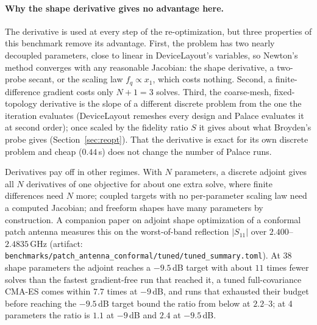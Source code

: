 \documentclass{anvil-paper}
\begin{document}
\paragraph{Why the shape derivative gives no advantage here.}
The derivative is used at every step of the re-optimization, but three
properties of this benchmark remove its advantage. First, the problem has
two nearly decoupled parameters, close to linear in DeviceLayout's
variables, so Newton's method converges with any reasonable Jacobian: the
shape derivative, a two-probe secant, or the scaling law $f_q \propto x_1$,
which costs nothing. Second, a finite-difference gradient costs only $N+1 =
3$ solves. Third, the coarse-mesh, fixed-topology derivative is the slope
of a different discrete problem from the one the iteration evaluates
(DeviceLayout remeshes every design and Palace evaluates it at second
order); once scaled by the fidelity ratio $S$ it gives about what
Broyden's probe gives (Section~\ref{sec:reopt}). That the derivative is exact for its own
discrete problem and cheap ($0.44$\,s) does not change the number of
Palace runs.

Derivatives pay off in other regimes. With $N$ parameters, a discrete
adjoint gives all $N$ derivatives of one objective for about one extra
solve, where finite differences need $N$ more; coupled targets with no
per-parameter scaling law need a computed Jacobian; and freeform shapes
have many parameters by construction. A companion paper on adjoint shape
optimization of a conformal patch antenna \citep{walters2026conformal}
measures this on the worst-of-band reflection $|S_{11}|$ over
$2.400$--$2.4835$\,GHz (artifact:
\texttt{benchmarks/patch\_antenna\_conformal/tuned/tuned\_summary.toml}).
At 38 shape parameters the adjoint reaches a $-9.5$\,dB target with about
$11$ times fewer solves than the fastest gradient-free run that reached it,
a tuned full-covariance CMA-ES comes within $7.7$ times at $-9$\,dB, and
runs that exhausted their budget before reaching the $-9.5$\,dB target
bound the ratio from below at $2.2$--$3$; at 4 parameters the ratio is $1.1$ at
$-9$\,dB and $2.4$ at $-9.5$\,dB.
\end{document}

